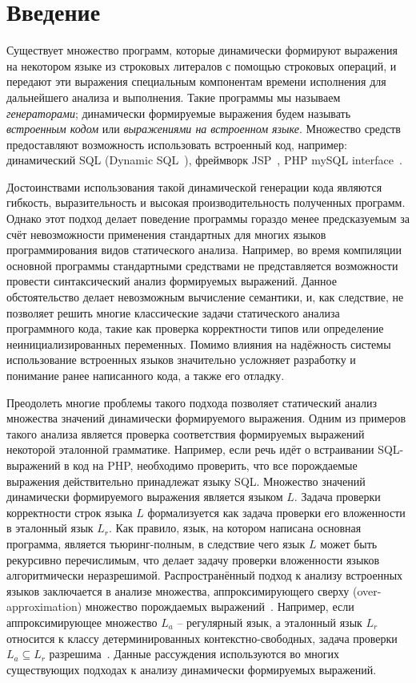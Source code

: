 \section*{Введение}
Существует множество программ, которые динамически формируют выражения на  некотором языке из строковых литералов с помощью строковых операций, и передают эти выражения специальным компонентам времени исполнения для дальнейшего анализа и выполнения. Такие программы мы называем \emph{генераторами}; динамически формируемые выражения будем называть \emph{встроенным кодом} или \emph{выражениями на встроенном языке}. Множество средств предоставляют возможность использовать встроенный код, например: динамический SQL (Dynamic SQL~\cite{DSQLISO}), фреймворк JSP~\cite{JSP}, PHP mySQL interface~\cite{PHPmySQL}. 

Достоинствами использования такой динамической генерации кода являются гибкость, выразительность и высокая производительность полученных программ. Однако этот подход делает поведение программы гораздо менее предсказуемым за счёт невозможности применения стандартных для многих языков программирования видов статического анализа. Например, во время компиляции основной программы стандартными средствами не представляется возможности провести синтаксический анализ формируемых выражений. Данное обстоятельство делает невозможным вычисление семантики, и, как следствие, не позволяет решить многие классические задачи статического анализа программного кода, такие как проверка корректности типов или определение неинициализированных переменных. Помимо влияния на надёжность системы использование встроенных языков значительно усложняет разработку и понимание ранее написанного кода, а также его отладку. 

Преодолеть многие проблемы такого подхода позволяет статический анализ множества значений динамически формируемого выражения. Одним из примеров такого анализа  является проверка соответствия формируемых выражений некоторой эталонной  грамматике. Например, если речь идёт о встраивании SQL-выражений в код на PHP,  необходимо проверить, что все порождаемые выражения действительно принадлежат  языку SQL. Множество значений динамически формируемого выражения является  языком $L$. Задача проверки корректности строк языка $L$ формализуется как задача проверки его вложенности в эталонный язык $L_{r}$. Как правило, язык, на котором написана основная программа, является тьюринг-полным, в  следствие чего язык $L$ может быть рекурсивно перечислимым, что делает задачу проверки вложенности языков алгоритмически неразрешимой. Распространённый подход к анализу встроенных языков заключается в анализе множества, аппроксимирующего сверху (over-approximation) множество порождаемых выражений~\cite{Stranger,JSA,Alvor,Alvor2}. Например, если аппроксимирующее множество $L_{a}$ -- регулярный язык, а эталонный язык $L_{r}$ относится к классу детерминированных контекстно-свободных, задача проверки $L_{a} \subseteq L_{r}$ разрешима~\cite{LangInclusion}. Данные рассуждения используются во многих существующих подходах к анализу динамически формируемых выражений. 

